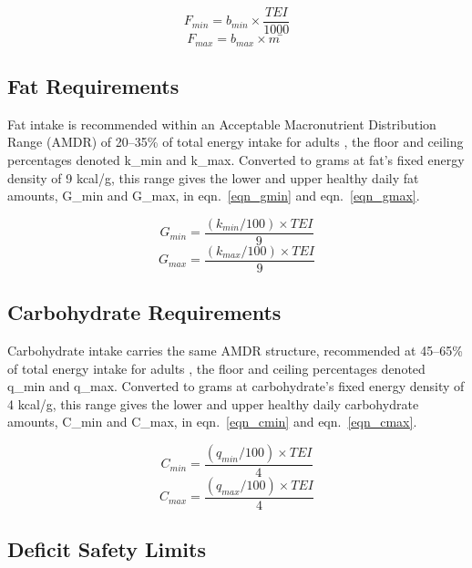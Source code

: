 \begin{equation}
\label{eqn_fmin}
F_{min} = b_{min} × \frac{TEI}{1000}
\end{equation}
\begin{equation}
\label{eqn_fmax}
F_{max} = b_{max} × m̄
\end{equation}

\subsection{Fat Requirements}

Fat intake is recommended within an Acceptable Macronutrient Distribution Range (AMDR) of 20–35\% of total energy intake for adults \cite{ref_iom2005}, the floor and ceiling percentages denoted k\_min and k\_max. Converted to grams at fat's fixed energy density of 9 kcal/g, this range gives the lower and upper healthy daily fat amounts, G\_min and G\_max, in eqn.~\eqref{eqn_gmin} and eqn.~\eqref{eqn_gmax}.

\begin{equation}
\label{eqn_gmin}
G_{min} = \frac{(k_{min}/100) × TEI}{9}
\end{equation}
\begin{equation}
\label{eqn_gmax}
G_{max} = \frac{(k_{max}/100) × TEI}{9}
\end{equation}

\subsection{Carbohydrate Requirements}

Carbohydrate intake carries the same AMDR structure, recommended at 45–65\% of total energy intake for adults \cite{ref_iom2005}, the floor and ceiling percentages denoted q\_min and q\_max. Converted to grams at carbohydrate's fixed energy density of 4 kcal/g, this range gives the lower and upper healthy daily carbohydrate amounts, C\_min and C\_max, in eqn.~\eqref{eqn_cmin} and eqn.~\eqref{eqn_cmax}.

\begin{equation}
\label{eqn_cmin}
C_{min} = \frac{(q_{min}/100) × TEI}{4}
\end{equation}
\begin{equation}
\label{eqn_cmax}
C_{max} = \frac{(q_{max}/100) × TEI}{4}
\end{equation}

\subsection{Deficit Safety Limits}

